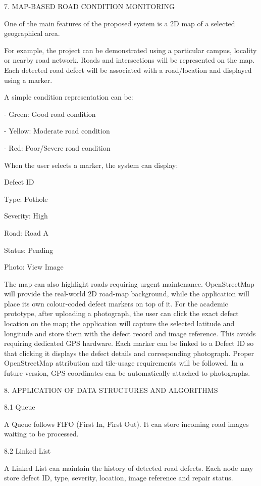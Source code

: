 \documentclass[
]{article}
\begin{document}
7. MAP-BASED ROAD CONDITION MONITORING

One of the main features of the proposed system is a 2D map of a
selected geographical area.

For example, the project can be demonstrated using a particular campus,
locality or nearby road network. Roads and intersections will be
represented on the map. Each detected road defect will be associated
with a road/location and displayed using a marker.

A simple condition representation can be:

- Green: Good road condition

- Yellow: Moderate road condition

- Red: Poor/Severe road condition

When the user selects a marker, the system can display:

Defect ID

Type: Pothole

Severity: High

Road: Road A

Status: Pending

Photo: View Image

The map can also highlight roads requiring urgent maintenance.
OpenStreetMap will provide the real-world 2D road-map background, while
the application will place its own colour-coded defect markers on top of
it. For the academic prototype, after uploading a photograph, the user
can click the exact defect location on the map; the application will
capture the selected latitude and longitude and store them with the
defect record and image reference. This avoids requiring dedicated GPS
hardware. Each marker can be linked to a Defect ID so that clicking it
displays the defect details and corresponding photograph. Proper
OpenStreetMap attribution and tile-usage requirements will be followed.
In a future version, GPS coordinates can be automatically attached to
photographs.

8. APPLICATION OF DATA STRUCTURES AND ALGORITHMS

8.1 Queue

A Queue follows FIFO (First In, First Out). It can store incoming road
images waiting to be processed.

8.2 Linked List

A Linked List can maintain the history of detected road defects. Each
node may store defect ID, type, severity, location, image reference and
repair status.
\end{document}
